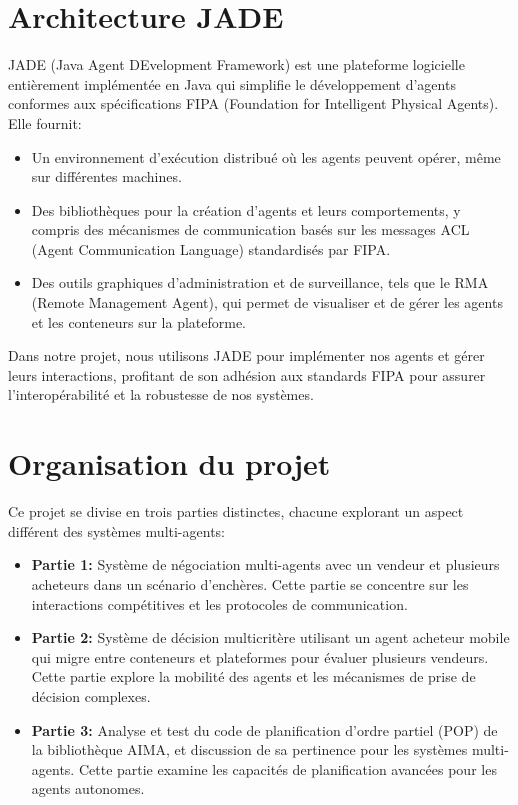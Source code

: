 \documentclass[a4paper,12pt]{report}
\begin{document}
\section{Architecture JADE}
JADE (Java Agent DEvelopment Framework) est une plateforme logicielle entièrement implémentée en Java qui simplifie le développement d'agents conformes aux spécifications FIPA (Foundation for Intelligent Physical Agents). Elle fournit:
\begin{itemize}
    \item Un environnement d'exécution distribué où les agents peuvent opérer, même sur différentes machines.
    \item Des bibliothèques pour la création d'agents et leurs comportements, y compris des mécanismes de communication basés sur les messages ACL (Agent Communication Language) standardisés par FIPA.
    \item Des outils graphiques d'administration et de surveillance, tels que le RMA (Remote Management Agent), qui permet de visualiser et de gérer les agents et les conteneurs sur la plateforme.
\end{itemize}

Dans notre projet, nous utilisons JADE pour implémenter nos agents et gérer leurs interactions, profitant de son adhésion aux standards FIPA pour assurer l'interopérabilité et la robustesse de nos systèmes.

\section{Organisation du projet}
Ce projet se divise en trois parties distinctes, chacune explorant un aspect différent des systèmes multi-agents:
\begin{itemize}
    \item \textbf{Partie 1:} Système de négociation multi-agents avec un vendeur et plusieurs acheteurs dans un scénario d'enchères. Cette partie se concentre sur les interactions compétitives et les protocoles de communication.
    \item \textbf{Partie 2:} Système de décision multicritère utilisant un agent acheteur mobile qui migre entre conteneurs et plateformes pour évaluer plusieurs vendeurs. Cette partie explore la mobilité des agents et les mécanismes de prise de décision complexes.
    \item \textbf{Partie 3:} Analyse et test du code de planification d'ordre partiel (POP) de la bibliothèque AIMA, et discussion de sa pertinence pour les systèmes multi-agents. Cette partie examine les capacités de planification avancées pour les agents autonomes.
\end{itemize}
\end{document}
